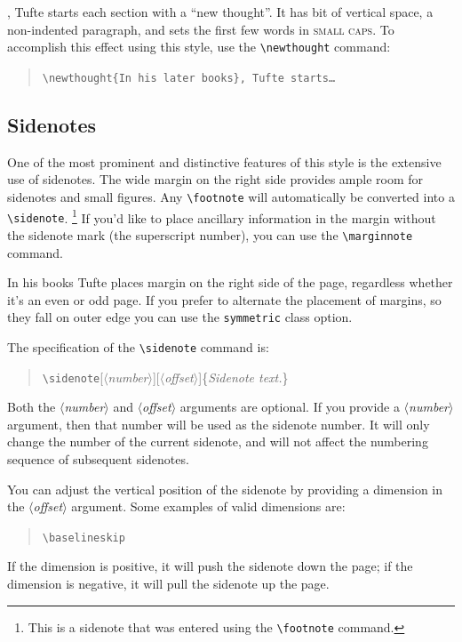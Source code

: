 \documentclass[a4paper]{tufte-handout}
\newcommand{\hlorange}[1]{\textcolor{tufte-orange}{#1}}
\newcommand{\doccmd}[1]{\hlorange{\texttt{\textbackslash#1}}}
\newcommand{\docopt}[1]{\( \langle \)\textrm{\textit{#1}}\( \rangle \)}
\newcommand{\docarg}[1]{\textrm{\textit{#1}}}
\newcommand{\docclsopt}[1]{\hlorange{\texttt{#1}}}
\newenvironment{docspec}
  {\begin{quotation}\ttfamily\parskip0pt\parindent0pt\ignorespaces}
  {\end{quotation}}
\begin{document}
,\cite{Tufte2006} Tufte starts each section with a ``new thought''.
It has bit of vertical space, a non-indented paragraph, and sets the first few words in \textsc{small caps}.
To accomplish this effect using this style, use the \Verb|\newthought| command:
\begin{docspec}
  \doccmd{newthought\{In his later books\}, Tufte starts\ldots}
\end{docspec}

\subsection{Sidenotes}\label{ssec:sidenotes}
One of the most prominent and distinctive features of this style is the extensive use of sidenotes.
The wide margin on the right side provides ample room for sidenotes and small figures.
Any \doccmd{footnote} will automatically be converted into a \doccmd{sidenote}.%
\footnote{This is a sidenote that was entered using the \doccmd{footnote} command.}
If you'd like to place ancillary information in the margin without the sidenote mark (the superscript
number), you can use the \doccmd{marginnote} command.

In his books Tufte places margin on the right side of the page, regardless whether it's an even or odd page.
If you prefer to alternate the placement of margins, so they fall on outer edge you can use the \docclsopt{symmetric} class option.

The specification of the \doccmd{sidenote} command is:
\begin{docspec}
  \doccmd{sidenote}[\docopt{number}][\docopt{offset}]\{\docarg{Sidenote text.}\}
\end{docspec}

Both the \docopt{number} and \docopt{offset} arguments are optional.
If you provide a \docopt{number} argument, then that number will be used as the sidenote number.
It will only change the number of the current sidenote, and will not affect the numbering sequence of subsequent sidenotes.

You can adjust the vertical position of the sidenote by providing a dimension in the \docopt{offset} argument.
Some examples of valid dimensions are:
\begin{docspec}
  \ttfamily 1.0in \qquad 2.54cm \qquad 254mm \Verb|\baselineskip|
\end{docspec}
If the dimension is positive, it will push the sidenote down the page; if the dimension is negative, it will pull the sidenote up the page.
\end{document}
